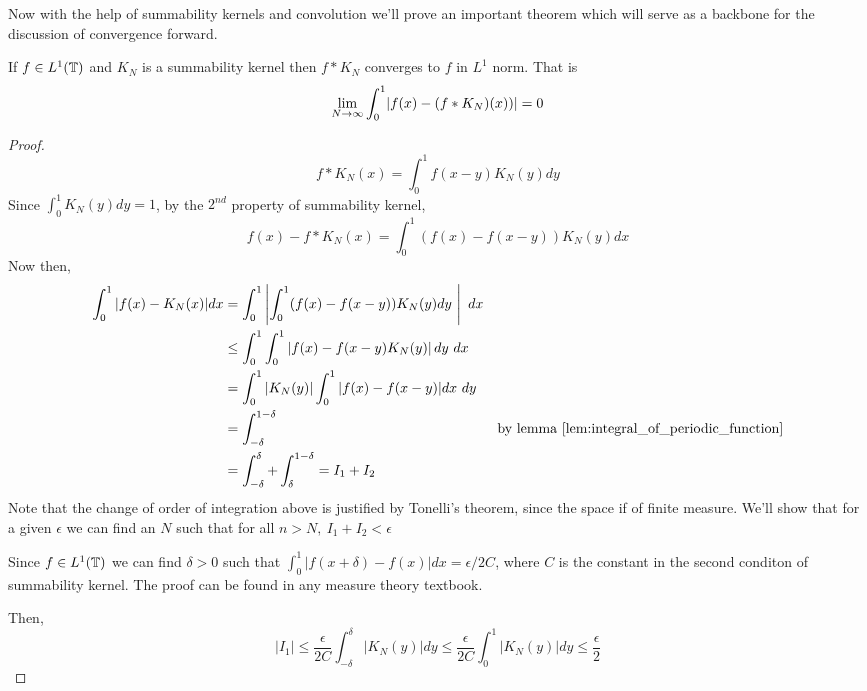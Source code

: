   Now with the help of summability kernels and convolution we'll prove an important theorem which will serve as a backbone for the discussion of convergence forward.
  \begin{theorem}
    \label{thm:L1_convergence_of_summability_kernel}
    If $f\in L^1(\mathbb T)$ and $K_N$ is a summability kernel then $f*K_N$ converges to $f$ in $L^1$ norm. That is
    \begin{displaymath}
      \lim_{N\to \infty} \int_{0}^{1}\lvert f(x) - (f*K_N)(x))\rvert = 0
    \end{displaymath}
\end{theorem}
  \begin{proof}
    \begin{displaymath}
      f*K_N(x) = \int_0^1 f(x-y)K_N(y)dy
    \end{displaymath}
    Since $\int_0^1 K_N(y)dy = 1$, by the $2^{nd}$ property of summability kernel,
    \begin{displaymath}
      f(x) - f*K_N(x) = \int_0^1\left(f(x)-f(x-y)\right)K_N(y)dx
    \end{displaymath}
    Now then, 
    \begin{align*}
      \int_0^1 |f(x) - K_N(x)| dx &= \int_0^1 \left| \int_0^1 (f(x) - f(x-y))K_N(y)dy \ \right| \ dx \\
                &\le \int_0^1 \int_0^1 \left| f(x) - f(x-y) K_N(y) \right| dy \ dx \\
                &= \int_0^1 |K_N(y)| \int_0^1 |f(x) - f(x-y)| dx \ dy \\
                &= \int_{-\delta}^{1-\delta} & \text{by lemma } \ref{lem:integral_of_periodic_function}\\
                &= \int_{-\delta}^{\delta} + \int_{\delta}^{1-\delta} = I_1 + I_2\\
    \end{align*}
    Note that the change of order of integration above is justified by Tonelli's theorem, since the space if of finite measure. We'll show that for a given $\epsilon$ we can find an $N$ such that for all $n>N, \ I_1+I_2 < \epsilon$

    Since $f \in L^1(\mathbb T)$ we can find $\delta >0$ such that $\int_0^1| f(x+\delta) - f(x) | dx = \epsilon / 2C$, where $C$ is the constant in the second conditon of summability kernel. The proof can be found in any measure theory textbook.
    
    Then, 
    \begin{displaymath}
      |I_1| \le \frac{\epsilon}{2C} \int_{-\delta}^{\delta}|K_N(y)|dy \le \frac{\epsilon}{2C} \int_0^1 |K_N(y)| dy \le \frac{\epsilon}{2}
    \end{displaymath}  
    

\end{proof}
